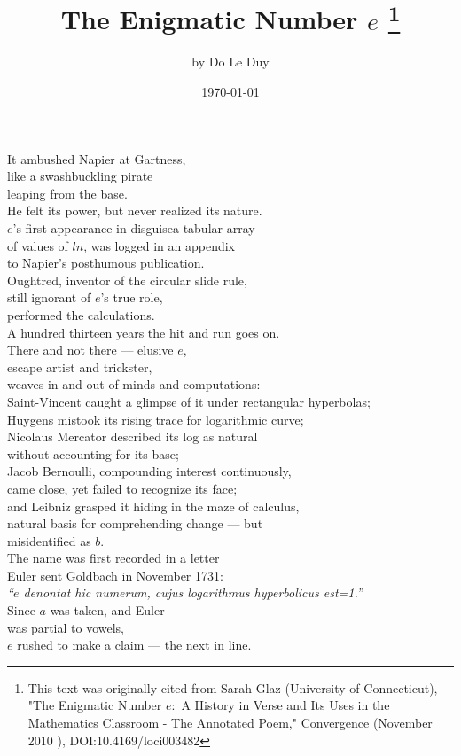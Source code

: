 \documentclass[11pt]{article}
\title{The Enigmatic Number $e$ \thanks{This text was originally cited from Sarah Glaz (University of Connecticut), "The Enigmatic Number \(e:\) A History in Verse and Its Uses in the Mathematics Classroom - The Annotated Poem," Convergence (November 2010 ), DOI:10.4169/loci003482}}
\author{by Do Le Duy}
\date{\today}
\begin{document}
\maketitle
\noindent It ambushed Napier at Gartness, \\
like a swashbuckling pirate \\
leaping from the base. \\
He felt its power, but never realized its nature. \\
$e$’s first appearance in disguisea tabular array \\
of values of $ln$, was logged in an appendix \\
to Napier’s posthumous publication. \\
Oughtred, inventor of the circular slide rule, \\
still ignorant of $e$’s true role, \\
performed the calculations. \\

\noindent A hundred thirteen years the hit and run goes on. \\
There and not there — elusive $e$, \\
escape artist and trickster, \\
weaves in and out of minds and computations: \\

\noindent Saint-Vincent caught a glimpse of it under rectangular hyperbolas; \\
Huygens mistook its rising trace for logarithmic curve; \\
Nicolaus Mercator described its log as natural \\
without accounting for its base; \\
Jacob Bernoulli, compounding interest continuously, \\
came close, yet failed to recognize its face; \\
and Leibniz grasped it hiding in the maze of calculus, \\
natural basis for comprehending change — but \\
misidentified as $b$. \\

\noindent The name was first recorded in a letter \\
Euler sent Goldbach in November 1731: \\
\emph{“$e$ denontat hic numerum, cujus logarithmus hyperbolicus est=1.”} \\
Since $a$ was taken, and Euler \\
was partial to vowels, \\
$e$ rushed to make a claim — the next in line.\\
\end{document}
